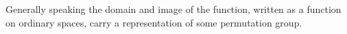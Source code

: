 \documentclass[reprint,twocolumn,amsmath,amssymb,aps]{revtex4-1}
\newcommand{\NN}{\mathcal{NN}}
\newcommand{\XX}{\mathcal{X}}
\newcommand{\YY}{\mathcal{Y}}
\newcommand{\X}{\mathbf{X}}
\newcommand{\Y}{\mathbf{Y}}
\begin{document}
Generally speaking the domain and image of the function, written as a function on ordinary spaces, carry a representation of some permutation group.
%
%
%
%
%
%
%
%
%
%
%
%
%
%
\end{document}
